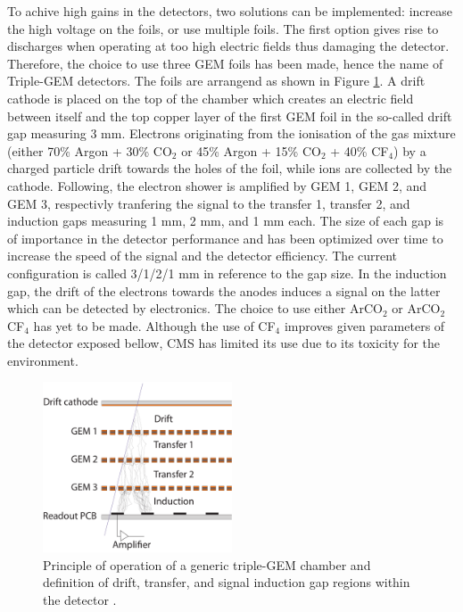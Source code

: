     To achive high gains in the detectors, two solutions can be implemented: increase the high voltage on the foils, or use multiple foils. The first option gives rise to discharges when operating at too high electric fields thus damaging the detector. Therefore, the choice to use three GEM foils has been made, hence the name of Triple-GEM detectors. The foils are arrangend as shown in Figure \ref{fig:II-1-triple}. A drift cathode is placed on the top of the chamber which creates an electric field between itself and the top copper layer of the first GEM foil in the so-called drift gap measuring 3 mm. Electrons originating from the ionisation of the gas mixture (either 70\% Argon + 30\% CO$_2$ or 45\% Argon + 15\% CO$_2$ + 40\% CF$_4$) by a charged particle drift towards the holes of the foil, while ions are collected by the cathode. Following, the electron shower is amplified by GEM 1, GEM 2, and GEM 3, respectivly tranfering the signal to the transfer 1, transfer 2, and induction gaps measuring 1 mm, 2 mm, and 1 mm each. The size of each gap is of importance in the detector performance and has been optimized over time to increase the speed of the signal and the detector efficiency. The current configuration is called 3/1/2/1 mm in reference to the gap size. In the induction gap, the drift of the electrons towards the anodes induces a signal on the latter which can be detected by electronics. The choice to use either ArCO$_2$ or ArCO$_2$CF$_4$ has yet to be made. Although the use of CF$_4$ improves given parameters of the detector exposed bellow, CMS has limited its use due to its toxicity for the environment. \\

    \begin{figure}[h!]
      \centering
      \includegraphics[width=0.5\textwidth]{img/II-1-gem/triple-gem-foils.pdf}
      \caption{Principle of operation of a generic triple-GEM chamber and definition of drift, transfer, and signal induction gap regions within the detector \cite{Colaleo:2021453}.}
      \label{fig:II-1-triple}
    \end{figure}

